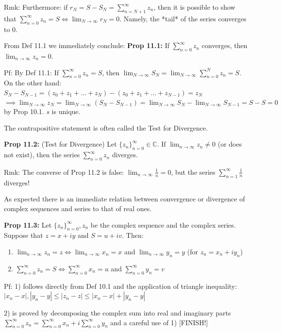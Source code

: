 \documentclass{article}
\begin{document}
Rmk: Furthermore: if $r_N = S - S_N = \sum_{n=N+1}^{\infty} z_n$, then it is possible to show that $\sum_{n=0}^{\infty} z_n = S \iff \lim_{N \to \infty} r_N = 0$. Namely, the *tail* of the series converges to 0.

From Def 11.1 we immediately conclude:
\textbf{Prop 11.1:} If $\sum_{n=0}^{\infty} z_n$ converges, then $\lim_{n \to \infty} z_n = 0$.

Pf: By Def 11.1: If $\sum_{n=0}^{\infty} z_n = S$, then $\lim_{N \to \infty} S_N = \lim_{N \to \infty} \sum_{n=0}^{N} z_n = S$. On the other hand: $S_N - S_{N-1} = (z_0 + z_1 + \dots + z_N) - (z_0 + z_1 + \dots + z_{N-1}) = z_N$
$\implies \lim_{N \to \infty} z_N = \lim_{N \to \infty} (S_N - S_{N-1}) = \lim_{N \to \infty} S_N - \lim_{N \to \infty} S_{N-1} = S - S = 0$ by Prop 10.1. $s$ is unique.

The contrapositive statement is often called the Test for Divergence.

\textbf{Prop 11.2:} (Test for Divergence) Let $\{z_n\}_{n=0}^{\infty} \in \mathbb{C}$. If $\lim_{n \to \infty} z_n \neq 0$ (or does not exist), then the series $\sum_{n=0}^{\infty} z_n$ diverges.

Rmk: The converse of Prop 11.2 is false: $\lim_{n \to \infty} \frac{1}{n} = 0$, but the series $\sum_{n=1}^{\infty} \frac{1}{n}$ diverges!

As expected there is an immediate relation between convergence or divergence of complex sequences and series to that of real ones.

\textbf{Prop 11.3:} Let $\{z_n\}_{n=0}^{\infty}, z_n$ be the complex sequence and the complex series. Suppose that $z = x + iy$ and $S = u + iv$. Then:
\begin{enumerate}
    \item $\lim_{n \to \infty} z_n = z \iff \lim_{n \to \infty} x_n = x$ and $\lim_{n \to \infty} y_n = y$ (for $z_n = x_n + iy_n$)
    \item $\sum_{n=0}^{\infty} z_n = S \iff \sum_{n=0}^{\infty} x_n = u$ and $\sum_{n=0}^{\infty} y_n = v$
\end{enumerate}

Pf: 1) follows directly from Def 10.1 and the application of triangle inequality: $|x_n - x|, |y_n - y| \leq |z_n - z| \leq |x_n - x| + |y_n - y|$

2) is proved by decomposing the complex sum into real and imaginary parts $\sum_{n=0}^{\infty} z_n = \sum_{n=0}^{\infty} x_n + i\sum_{n=0}^{\infty} y_n$ and a careful use of 1) [FINISH!]
\end{document}
